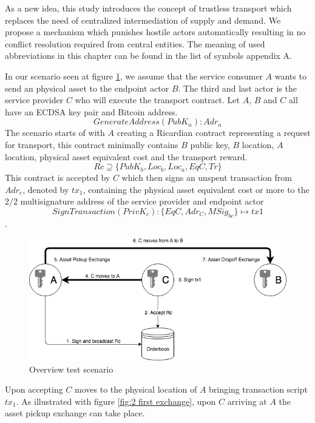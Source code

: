As a new idea, this study introduces the concept of trustless transport which replaces the need of centralized intermediation of supply and demand. We propose a mechanism which punishes hostile actors automatically resulting in no conflict resolution required from central entities. The meaning of used abbreviations in this chapter can be found in the list of symbols appendix A.\par
In our scenario seen at figure \ref{fig:1 main overview}, we assume that the service consumer $A$ wants to send an physical asset to the endpoint actor $B$. The third and last actor is the service provider $C$ who will execute the transport contract. Let $A$, $B$ and $C$ all have an ECDSA key pair and Bitcoin address. \[GenerateAddress(PubK_n)\colon Adr_n\]
The scenario starts of with $A$ creating a Ricardian contract representing a request for transport, this contract minimally contains $B$ public key, $B$ location, $A$ location, physical asset equivalent cost and the transport reward.
\[Rc \supseteq \{PubK_b, Loc_b, Loc_a, EqC, Tr\}\]
This contract is accepted by $C$ which then signs an unspent transaction from $Adr_c$, denoted by $tx_1$, containing the physical asset equivalent cost or more to the $2/2$ multisignature address of the service provider and endpoint actor
\[SignTransaction(PrivK_c)\colon\{EqC, Adr_C, MSig_{bc}\}\mapsto tx1\].

\begin{figure}[h]
\centering
\includegraphics[width=1\textwidth]{images/main.png}
\caption{Overview test scenario}
\label{fig:1 main overview}
\end{figure}

Upon accepting $C$ moves to the physical location of $A$ bringing transaction script $tx_1$. As illustrated with figure \ref{fig:2 first exchange}, upon $C$ arriving at $A$ the asset pickup exchange can take place.

